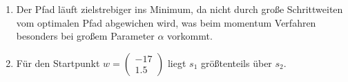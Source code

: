 \documentclass{article}
\begin{document}
\begin{enumerate}
\begin{enumerate}[label=\alph*)]
          \item Der Pfad läuft zielstrebiger ins Minimum, da nicht durch große Schrittweiten vom optimalen Pfad abgewichen wird, was beim momentum Verfahren besonders bei großem Parameter $\alpha$ vorkommt.
          \item Für den Startpunkt $w=\begin{pmatrix} -17 \\ 1.5 \end{pmatrix}$ liegt $s_1$ größtenteils über $s_2$.
        \end{enumerate}
\end{enumerate}
\end{document}
